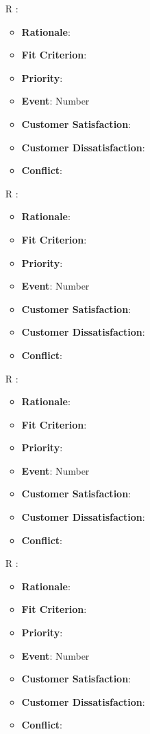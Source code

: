 \documentclass[12pt, titlepage]{article}
\newcounter{reqnum} %
\begin{document}
\begin{itemize}
\item[R\refstepcounter{reqnum}\thereqnum
\label{R_Inputs_1}:] 
\begin{itemize}
    \item \textbf{Rationale}:
    \item \textbf{Fit Criterion}:
    \item \textbf{Priority}:
    \item \textbf{Event}: Number
    \item \textbf{Customer Satisfaction}:
    \item \textbf{Customer Dissatisfaction}:
    \item \textbf{Conflict}:
\end{itemize}

\item[R\refstepcounter{reqnum}\thereqnum
\label{R_Inputs_1}:] 
\begin{itemize}
    \item \textbf{Rationale}:
    \item \textbf{Fit Criterion}:
    \item \textbf{Priority}:
    \item \textbf{Event}: Number
    \item \textbf{Customer Satisfaction}:
    \item \textbf{Customer Dissatisfaction}:
    \item \textbf{Conflict}:
\end{itemize}

\item[R\refstepcounter{reqnum}\thereqnum
\label{R_Inputs_1}:] 
\begin{itemize}
    \item \textbf{Rationale}:
    \item \textbf{Fit Criterion}:
    \item \textbf{Priority}:
    \item \textbf{Event}: Number
    \item \textbf{Customer Satisfaction}:
    \item \textbf{Customer Dissatisfaction}:
    \item \textbf{Conflict}:
\end{itemize}

\item[R\refstepcounter{reqnum}\thereqnum
\label{R_Inputs_1}:] 
\begin{itemize}
    \item \textbf{Rationale}:
    \item \textbf{Fit Criterion}:
    \item \textbf{Priority}:
    \item \textbf{Event}: Number
    \item \textbf{Customer Satisfaction}:
    \item \textbf{Customer Dissatisfaction}:
    \item \textbf{Conflict}:
\end{itemize}


\end{itemize}
\end{document}
